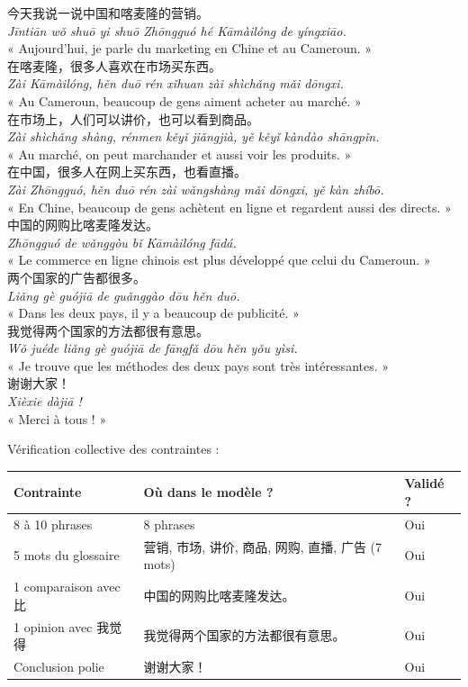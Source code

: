 \documentclass[11pt]{article}
\begin{document}
\begin{textebox}
今天我说一说中国和喀麦隆的营销。\\
\emph{Jīntiān wǒ shuō yi shuō Zhōngguó hé Kāmàilóng de yíngxiāo.}\\
« Aujourd'hui, je parle du marketing en Chine et au Cameroun. »\\[0.4em]
在喀麦隆，很多人喜欢在市场买东西。\\
\emph{Zài Kāmàilóng, hěn duō rén xǐhuan zài shìchǎng mǎi dōngxi.}\\
« Au Cameroun, beaucoup de gens aiment acheter au marché. »\\[0.4em]
在市场上，人们可以讲价，也可以看到商品。\\
\emph{Zài shìchǎng shàng, rénmen kěyǐ jiǎngjià, yě kěyǐ kàndào shāngpǐn.}\\
« Au marché, on peut marchander et aussi voir les produits. »\\[0.4em]
在中国，很多人在网上买东西，也看直播。\\
\emph{Zài Zhōngguó, hěn duō rén zài wǎngshàng mǎi dōngxi, yě kàn zhíbō.}\\
« En Chine, beaucoup de gens achètent en ligne et regardent aussi des directs. »\\[0.4em]
中国的网购比喀麦隆发达。\\
\emph{Zhōngguó de wǎnggòu bǐ Kāmàilóng fādá.}\\
« Le commerce en ligne chinois est plus développé que celui du Cameroun. »\\[0.4em]
两个国家的广告都很多。\\
\emph{Liǎng gè guójiā de guǎnggào dōu hěn duō.}\\
« Dans les deux pays, il y a beaucoup de publicité. »\\[0.4em]
我觉得两个国家的方法都很有意思。\\
\emph{Wǒ juéde liǎng gè guójiā de fāngfǎ dōu hěn yǒu yìsi.}\\
« Je trouve que les méthodes des deux pays sont très intéressantes. »\\[0.4em]
谢谢大家！\\
\emph{Xièxie dàjiā !}\\
« Merci à tous ! »
\end{textebox}

Vérification collective des contraintes :

\begin{center}
\begin{tabularx}{\linewidth}{|X|X|X|}\hline
\rowcolor{popblueL} Contrainte & Où dans le modèle ? & Validé ? \\ \hline
8 à 10 phrases & 8 phrases & Oui \\ \hline
5 mots du glossaire & 营销, 市场, 讲价, 商品, 网购, 直播, 广告 (7 mots) & Oui \\ \hline
1 comparaison avec 比 & 中国的网购比喀麦隆发达。 & Oui \\ \hline
1 opinion avec 我觉得 & 我觉得两个国家的方法都很有意思。 & Oui \\ \hline
Conclusion polie & 谢谢大家！ & Oui \\ \hline
\end{tabularx}
\end{center}
\end{document}
